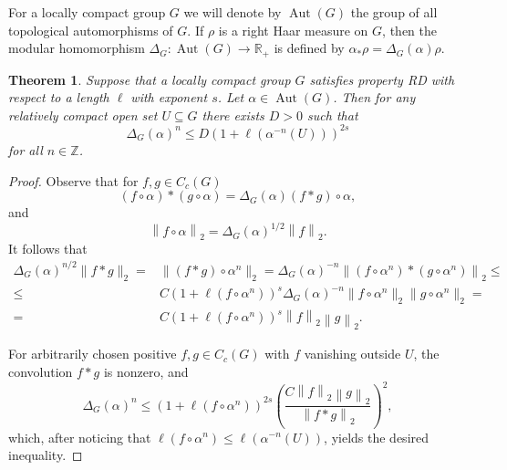 \documentclass{amsart}
\newtheorem{theorem}{Theorem}[section]
\theoremstyle{definition}
\theoremstyle{remark}
\begin{document}
For a locally compact group $G$ we will denote by $\operatorname{Aut}(G)$ the group
of all topological automorphisms of $G$. If $\rho$ is a right Haar
measure on $G$, then the modular homomorphism
$\Delta_G\colon\operatorname{Aut}(G)\to {\mathbb{R}}_+$ is defined by $\alpha_*\rho =
\Delta_G(\alpha)\rho$.

\begin{theorem}
  \label{thm:rd-obstruction}
  Suppose that a locally compact group $G$ satisfies property RD with respect to a length $\ell$
  with exponent $s$. Let $\alpha\in\operatorname{Aut}(G)$. Then for any relatively
  compact open set $U\subseteq G$ there exists $D>0$ such that
  \begin{equation}
    \label{eq:distortion-comparison}
    \Delta_G(\alpha)^{n} \leq D(1+
    \ell(\alpha^{-n}(U)))^{2s} 
  \end{equation}
  for all $n\in{\mathbb{Z}}$.
\end{theorem}

\begin{proof}
  Observe that for $f,g\in C_c(G)$
  \begin{equation}
    \label{eq:conv-identity}
    (f\circ\alpha)* (g\circ\alpha) = \Delta_G(\alpha)
    (f*g)\circ\alpha,
  \end{equation}
  and 
  \begin{equation}
    \label{eq:aut-norm}
    {\left\lVert{f\circ\alpha}\right\rVert}_2 = \Delta_G(\alpha)^{1/2}{\left\lVert{f}\right\rVert}_2.
  \end{equation}
  It follows that 
  \begin{equation}
    \label{eq:conv-ineq}
    \begin{split}
      \Delta_G(\alpha)^{n/2} \lVert f*g\rVert_2= &
      \lVert{(f*g)\circ\alpha^n}\rVert_2 = \Delta_G(\alpha)^{-n}
      \lVert{(f\circ\alpha^n)*(g\circ\alpha^n)\rVert}_2 \leq\\
      \leq & C(1+\ell(f\circ\alpha^n))^s \Delta_G(\alpha)^{-n} \lVert f\circ
      \alpha^n \rVert_2 \lVert g\circ\alpha^n\rVert_2 =\\
      =& C(1+\ell(f\circ\alpha^n))^s {\left\lVert{f}\right\rVert}_2{\left\lVert{g}\right\rVert}_2.
    \end{split}
  \end{equation}
  
  
  
  
  
  
  For arbitrarily chosen positive $f,g\in C_c(G)$ with $f$ vanishing
  outside $U$, the convolution $f*g$ is nonzero, and
  \begin{equation}
    \Delta_G(\alpha)^n \leq (1+\ell(f\circ\alpha^n))^{2s} 
    \left( \frac{C{\left\lVert{f}\right\rVert}_2{\left\lVert{g}\right\rVert}_2}{{\left\lVert{f*g}\right\rVert}_2}\right)^2,
  \end{equation}
  which, after noticing that $\ell(f\circ\alpha^n) \leq
  \ell(\alpha^{-n}(U))$, yields the desired inequality.
\end{proof}
\end{document}
